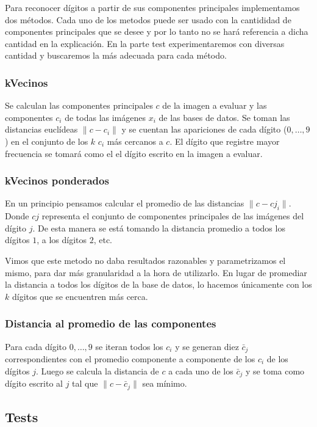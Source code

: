 	\PARstart Para reconocer d\'igitos a partir de sus componentes principales
	implementamos dos m\'etodos. Cada uno de los metodos puede ser usado con la
	cantididad de componentes principales que se desee y por lo tanto no se
	har\'a referencia a dicha cantidad en la explicaci\'on. En la parte test
	experimentaremos con diversas cantidad y buscaremos la m\'as adecuada para
	cada m\'etodo.

	\subsubsection{kVecinos}
		Se calculan las componentes principales $c$ de la imagen a evaluar
		y las componentes $c_i$ de todas las im\'agenes $x_i$ de las bases
		de datos. Se toman las distancias eucl\'ideas $\|c - c_i\|$
		y se cuentan las apariciones de cada d\'igito ($0, \ldots, 9$)
		en el conjunto de los $k$ $c_i$ m\'as cercanos a $c$.
		El d\'igito que registre mayor frecuencia se tomar\'a como el
		el d\'igito escrito en la imagen a evaluar.
	
	\subsubsection{kVecinos ponderados}
		En un principio pensamos calcular el promedio de las distancias $\|c - cj_i\|$.
		Donde $cj$ representa el conjunto de componentes principales de las
		im\'agenes del d\'igito $j$. De esta manera se est\'a tomando la 
		distancia promedio a todos los d\'igitos $1$, a los d\'igitos $2$, etc.

		Vimos que este metodo no daba resultados razonables y parametrizamos
		el mismo, para dar m\'as granularidad a la hora de utilizarlo.
		En lugar de promediar la distancia a todos los d\'igitos de la base
		de datos, lo hacemos \'unicamente con los $k$ d\'igitos que se
		encuentren m\'as cerca.
		
	\subsubsection{Distancia al promedio de las componentes}
		Para cada d\'igito $0, \ldots, 9$ se iteran todos los $c_i$ 
		y se generan diez $\bar{c}_j$ correspondientes con el
		promedio componente a componente de los $c_i$ de los
		d\'igitos $j$.
		Luego se calcula la distancia de $c$ a cada uno de los $\bar{c}_j$
		y se toma como d\'igito escrito al $j$ tal que $\|c - \bar{c}_j\|$
		sea m\'inimo.

\subsection{Tests}

